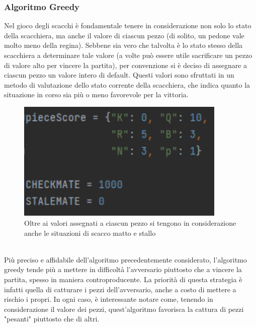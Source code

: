 \subsubsection{Algoritmo Greedy}
Nel gioco degli scacchi è fondamentale tenere in considerazione non solo lo stato della scacchiera, ma anche il valore di ciascun pezzo (di solito, un pedone vale molto meno della regina). Sebbene sia vero che talvolta è lo stato stesso della scacchiera a determinare tale valore (a volte può essere utile sacrificare un pezzo di valore alto per vincere la partita), per convenzione si è deciso di assegnare a ciascun pezzo un valore intero di default. Questi valori sono sfruttati in un metodo di valutazione dello stato corrente della scacchiera, che indica quanto la situazione in corso sia più o meno favorevole per la vittoria.
\begin{figure}[!htb]
    \includegraphics[width=10cm]{frontmatter/figure/valore_pezzi.pdf}
    \centering
    \caption{Oltre ai valori assegnati a ciascun pezzo si tengono in considerazione anche le situazioni di scacco matto e stallo}
    \label{fig:valore_pezzi}
\end{figure}\\

Più preciso e affidabile dell'algoritmo precedentemente considerato, l'algoritmo greedy tende più a mettere in difficoltà l'avversario piuttosto che a vincere la partita, spesso in maniera controproducente. La priorità di questa strategia è infatti quella di catturare i pezzi dell'avversario, anche a costo di mettere a rischio i propri. In ogni caso, è interessante notare come, tenendo in considerazione il valore dei pezzi, quest'algoritmo favorisca la cattura di pezzi "pesanti" piuttosto che di altri. 
